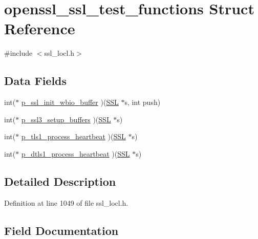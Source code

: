 \hypertarget{structopenssl__ssl__test__functions}{}\section{openssl\+\_\+ssl\+\_\+test\+\_\+functions Struct Reference}
\label{structopenssl__ssl__test__functions}


{\ttfamily \#include $<$ssl\+\_\+locl.\+h$>$}

\subsection*{Data Fields}
\begin{DoxyCompactItemize}
\item 
int($\ast$ \hyperlink{structopenssl__ssl__test__functions_ad7cd80cf2eb1a9b758c5a3014ba327dd}{p\+\_\+ssl\+\_\+init\+\_\+wbio\+\_\+buffer} )(\hyperlink{crypto_2ossl__typ_8h_a71f21e09bf365489dab9d85bd4785e24}{S\+SL} $\ast$s, int push)
\item 
int($\ast$ \hyperlink{structopenssl__ssl__test__functions_a06b37cc668d6c942c5b1614f89727cf0}{p\+\_\+ssl3\+\_\+setup\+\_\+buffers} )(\hyperlink{crypto_2ossl__typ_8h_a71f21e09bf365489dab9d85bd4785e24}{S\+SL} $\ast$s)
\item 
int($\ast$ \hyperlink{structopenssl__ssl__test__functions_abda2ad130796d4f3ff1228d835426dd3}{p\+\_\+tls1\+\_\+process\+\_\+heartbeat} )(\hyperlink{crypto_2ossl__typ_8h_a71f21e09bf365489dab9d85bd4785e24}{S\+SL} $\ast$s)
\item 
int($\ast$ \hyperlink{structopenssl__ssl__test__functions_a509a9bbb0f53f307a39ba565ea594252}{p\+\_\+dtls1\+\_\+process\+\_\+heartbeat} )(\hyperlink{crypto_2ossl__typ_8h_a71f21e09bf365489dab9d85bd4785e24}{S\+SL} $\ast$s)
\end{DoxyCompactItemize}


\subsection{Detailed Description}


Definition at line 1049 of file ssl\+\_\+locl.\+h.



\subsection{Field Documentation}
